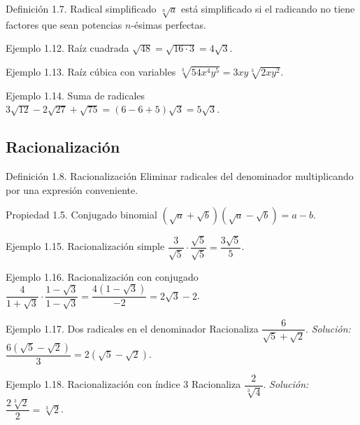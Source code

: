\documentclass[12pt,letterpaper]{book}
\begin{document}
\begin{defbox}{Definición 1.7. Radical simplificado}
$\sqrt[n]{a}$ está simplificado si el radicando no tiene factores que sean potencias $n$-ésimas perfectas.
\end{defbox}

\begin{ejbox}{Ejemplo 1.12. Raíz cuadrada}
$\sqrt{48}=\sqrt{16\cdot3}=4\sqrt3$.
\end{ejbox}

\begin{ejbox}{Ejemplo 1.13. Raíz cúbica con variables}
$\sqrt[3]{54x^4y^5}=3xy\sqrt[3]{2xy^2}$.
\end{ejbox}

\begin{ejbox}{Ejemplo 1.14. Suma de radicales}
$3\sqrt{12}-2\sqrt{27}+\sqrt{75}=(6-6+5)\sqrt3=5\sqrt3$.
\end{ejbox}

\subsection{Racionalización}

\begin{defbox}{Definición 1.8. Racionalización}
Eliminar radicales del denominador multiplicando por una expresión conveniente.
\end{defbox}

\begin{propbox}{Propiedad 1.5. Conjugado binomial}
$(\sqrt a+\sqrt b)(\sqrt a-\sqrt b)=a-b$.
\end{propbox}

\begin{ejbox}{Ejemplo 1.15. Racionalización simple}
$\dfrac{3}{\sqrt5}\cdot\dfrac{\sqrt5}{\sqrt5}=\dfrac{3\sqrt5}{5}$.
\end{ejbox}

\begin{ejbox}{Ejemplo 1.16. Racionalización con conjugado}
$\dfrac{4}{1+\sqrt3}\cdot\dfrac{1-\sqrt3}{1-\sqrt3}=\dfrac{4(1-\sqrt3)}{-2}=2\sqrt3-2$.
\end{ejbox}

\begin{ejbox}{Ejemplo 1.17. Dos radicales en el denominador}
Racionaliza $\dfrac{6}{\sqrt5+\sqrt2}$. \textit{Solución:} $\dfrac{6(\sqrt5-\sqrt2)}{3}=2(\sqrt5-\sqrt2)$.
\end{ejbox}

\begin{ejbox}{Ejemplo 1.18. Racionalización con índice 3}
Racionaliza $\dfrac{2}{\sqrt[3]4}$. \textit{Solución:} $\dfrac{2\sqrt[3]2}{2}=\sqrt[3]2$.
\end{ejbox}
\end{document}
